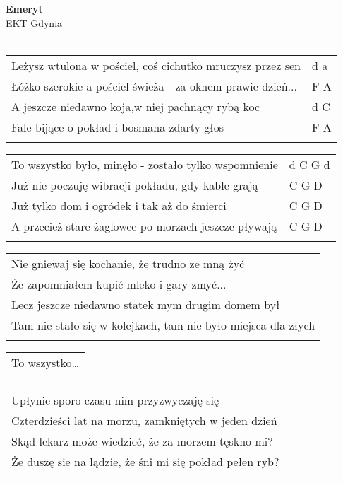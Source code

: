 \documentclass[a5paper]{article}
\begin{document}


\noindent
\fontsize{12pt}{15pt}\selectfont
\textbf{Emeryt} \\
\fontsize{8pt}{10pt}\selectfont
EKT Gdynia \\ \\
\fontsize{10pt}{12pt}\selectfont
{}
\begin{tabular}{@{}p{9.5cm}p{3cm}@{}}
\noindent
Leżysz wtulona w pościel, coś cichutko mruczysz przez sen & d a \\
Łóżko szerokie a pościel świeża - za oknem prawie dzień... & F A \\
A jeszcze niedawno koja,w niej pachnący rybą koc & d C \\
Fale bijące o pokład i bosmana zdarty głos & F A \\ \\
\end{tabular}

\noindent
\begin{tabular}{@{}p{8.5cm}p{3cm}@{}}
To wszystko było, minęło - zostało tylko wspomnienie & d C G d \\
Już nie poczuję wibracji pokładu, gdy kable grają & C G D \\
Już tylko dom i ogródek i tak aż do śmierci & C G D\\
A przecież stare żaglowce po morzach jeszcze pływają & C G D\\ \\
\end{tabular}

\noindent
\begin{tabular}{@{}p{9.5cm}@{}}
Nie gniewaj się kochanie, że trudno ze mną żyć \\
Że zapomniałem kupić mleko i gary zmyć... \\
Lecz jeszcze niedawno statek mym drugim domem był \\
Tam nie stało się w kolejkach, tam nie było miejsca dla złych \\ \\
\end{tabular}

\noindent
\begin{tabular}{@{}p{8.5cm}@{}}
To wszystko… \\ \\
\end{tabular}

\noindent
\begin{tabular}{@{}p{9.5cm}@{}}
Upłynie sporo czasu nim przyzwyczaję się \\
Czterdzieści lat na morzu, zamkniętych w jeden dzień \\
Skąd lekarz może wiedzieć, że za morzem tęskno mi? \\
Że duszę sie na lądzie, że śni mi się pokład pełen ryb? \\ \\
\end{tabular}
\end{document}
